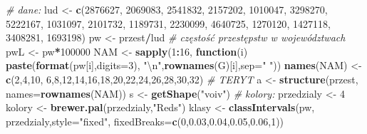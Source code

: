 \documentclass[polish,]{book}
\newenvironment{Shaded}{\begin{snugshade}}{\end{snugshade}}
\newcommand{\CharTok}[1]{\textcolor[rgb]{0.31,0.60,0.02}{#1}}
\newcommand{\CommentTok}[1]{\textcolor[rgb]{0.56,0.35,0.01}{\textit{#1}}}
\newcommand{\ControlFlowTok}[1]{\textcolor[rgb]{0.13,0.29,0.53}{\textbf{#1}}}
\newcommand{\DataTypeTok}[1]{\textcolor[rgb]{0.13,0.29,0.53}{#1}}
\newcommand{\DecValTok}[1]{\textcolor[rgb]{0.00,0.00,0.81}{#1}}
\newcommand{\FloatTok}[1]{\textcolor[rgb]{0.00,0.00,0.81}{#1}}
\newcommand{\KeywordTok}[1]{\textcolor[rgb]{0.13,0.29,0.53}{\textbf{#1}}}
\newcommand{\NormalTok}[1]{#1}
\newcommand{\OperatorTok}[1]{\textcolor[rgb]{0.81,0.36,0.00}{\textbf{#1}}}
\newcommand{\StringTok}[1]{\textcolor[rgb]{0.31,0.60,0.02}{#1}}
\begin{document}
\begin{Shaded}
\begin{Highlighting}[]
\CommentTok{# dane:}
\NormalTok{lud <-}\StringTok{ }\KeywordTok{c}\NormalTok{(}\DecValTok{2876627}\NormalTok{, }\DecValTok{2069083}\NormalTok{, }\DecValTok{2541832}\NormalTok{, }\DecValTok{2157202}\NormalTok{, }\DecValTok{1010047}\NormalTok{, }\DecValTok{3298270}\NormalTok{, }\DecValTok{5222167}\NormalTok{, }\DecValTok{1031097}\NormalTok{,}
         \DecValTok{2101732}\NormalTok{, }\DecValTok{1189731}\NormalTok{, }\DecValTok{2230099}\NormalTok{, }\DecValTok{4640725}\NormalTok{, }\DecValTok{1270120}\NormalTok{, }\DecValTok{1427118}\NormalTok{, }\DecValTok{3408281}\NormalTok{, }\DecValTok{1693198}\NormalTok{)}
\NormalTok{pw <-}\StringTok{ }\NormalTok{przest}\OperatorTok{/}\NormalTok{lud }\CommentTok{# częstość przestępstw w województwach}
\NormalTok{pwL <-}\StringTok{ }\NormalTok{pw}\OperatorTok{*}\DecValTok{100000}
\NormalTok{NAM <-}\StringTok{ }\KeywordTok{sapply}\NormalTok{(}\DecValTok{1}\OperatorTok{:}\DecValTok{16}\NormalTok{, }\ControlFlowTok{function}\NormalTok{(i) }\KeywordTok{paste}\NormalTok{(}\KeywordTok{format}\NormalTok{(pw[i],}\DataTypeTok{digits=}\DecValTok{3}\NormalTok{),}
                                      \StringTok{"}\CharTok{\textbackslash{}n}\StringTok{"}\NormalTok{,}\KeywordTok{rownames}\NormalTok{(G)[i],}\DataTypeTok{sep=}\StringTok{" "}\NormalTok{))}
\KeywordTok{names}\NormalTok{(NAM) <-}\StringTok{ }\KeywordTok{c}\NormalTok{(}\DecValTok{2}\NormalTok{,}\DecValTok{4}\NormalTok{,}\DecValTok{10}\NormalTok{, }\DecValTok{6}\NormalTok{,}\DecValTok{8}\NormalTok{,}\DecValTok{12}\NormalTok{,}\DecValTok{14}\NormalTok{,}\DecValTok{16}\NormalTok{,}\DecValTok{18}\NormalTok{,}\DecValTok{20}\NormalTok{,}\DecValTok{22}\NormalTok{,}\DecValTok{24}\NormalTok{,}\DecValTok{26}\NormalTok{,}\DecValTok{28}\NormalTok{,}\DecValTok{30}\NormalTok{,}\DecValTok{32}\NormalTok{) }\CommentTok{# TERYT}
\NormalTok{a <-}\StringTok{ }\KeywordTok{structure}\NormalTok{(przest, }\DataTypeTok{names=}\KeywordTok{rownames}\NormalTok{(NAM))}
\NormalTok{s <-}\StringTok{ }\KeywordTok{getShape}\NormalTok{(}\StringTok{"voiv"}\NormalTok{)}
\CommentTok{# kolory:}
\NormalTok{przedzialy <-}\StringTok{ }\DecValTok{4}
\NormalTok{kolory <-}\StringTok{ }\KeywordTok{brewer.pal}\NormalTok{(przedzialy,}\StringTok{"Reds"}\NormalTok{)}
\NormalTok{klasy <-}\StringTok{ }\KeywordTok{classIntervals}\NormalTok{(pw, przedzialy,}\DataTypeTok{style=}\StringTok{"fixed"}\NormalTok{,}
                        \DataTypeTok{fixedBreaks=}\KeywordTok{c}\NormalTok{(}\DecValTok{0}\NormalTok{,}\FloatTok{0.03}\NormalTok{,}\FloatTok{0.04}\NormalTok{,}\FloatTok{0.05}\NormalTok{,}\FloatTok{0.06}\NormalTok{,}\DecValTok{1}\NormalTok{))}

\end{Highlighting}
\end{Shaded}
\end{document}

